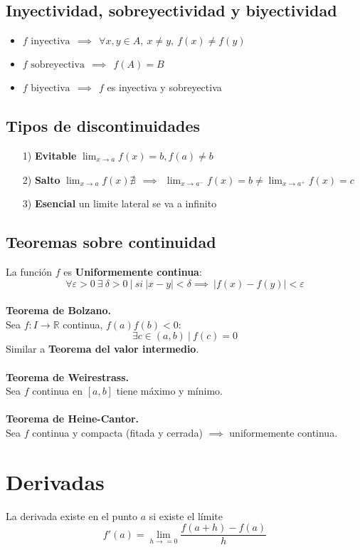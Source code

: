 \documentclass[12pt]{article}
\theoremstyle{plain}
\theoremstyle{definition}
\theoremstyle{remark}
\begin{document}
	\subsection{Inyectividad, sobreyectividad y biyectividad}
	\begin{itemize}
		\item $f \text{ inyectiva} \ \ \implies \ \ \forall x,y\in A, \ x\neq y, \ f(x)\neq f(y)$
		\item $f \text{ sobreyectiva} \ \ \implies \ \ f(A)=B$
		\item $f \text{ biyectiva} \ \ \implies \ \ f$ es inyectiva y sobreyectiva
	\end{itemize}
	\subsection{Tipos de discontinuidades}
	\begin{itemize}
		\item[1)] \textbf{Evitable} $\lim_{x\to a} f(x) =b, f(a)\neq b$
		\item[2)] \textbf{Salto} $\lim_{x\to a}{f(x)} \nexists \ \ \implies \ \ \lim_{x \to a^-}{f(x)}=b \neq \lim_{x\to a^+}{f(x)}=c$
		\item[3)] \textbf{Esencial} un limite lateral se va a infinito
	\end{itemize}
	\subsection{Teoremas sobre continuidad}
	
	La función $f$ es \textbf{Uniformemente continua}:
	\[\boxed{\forall \varepsilon >0 \ \exists \ \delta >0 \ | \ si \ |x-y|<\delta \implies \ |f(x)-f(y)|<\varepsilon}\] \\
	\textbf{Teorema de Bolzano.} \\
	Sea $f:I\to \mathbb{R}$ continua, $f(a)f(b)<0$:
	\[\exists c\in (a,b) \ | \ f(c) =0\]
	Similar a \textbf{Teorema del valor intermedio}. \\ \\
	\textbf{Teorema de Weirestrass.} \\
	Sea $f$ continua en $[a,b]$ tiene máximo y mínimo. \\ \\
	\textbf{Teorema de Heine-Cantor.} \\
	Sea $f$ continua y compacta (fitada y cerrada) $\implies$ uniformemente continua.
\section{Derivadas}
La derivada existe en el punto $a$ si existe el límite
\[\boxed{f'(a)=\lim_{h \to =0}{\frac{f(a+h)-f(a)}{h}}}\]
\end{document}
